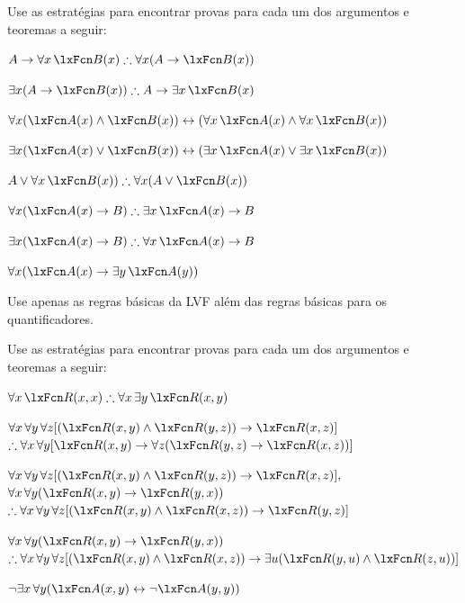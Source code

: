 \problempart
Use as estratégias para encontrar provas para cada um dos argumentos e teoremas a seguir:
\begin{compactlist}
\item $A \eif \forall x\,\atom{B}{x} \therefore \forall x(A \eif \atom{B}{x})$
\item $\exists x(A \eif \atom{B}{x}) \therefore A \eif \exists x\, \atom{B}{x}$
\item $\forall x(\atom{A}{x} \eand \atom{B}{x}) \eiff (\forall x\,\atom{A}{x} \eand \forall x\,\atom{B}{x})$
\item $\exists x(\atom{A}{x} \eor \atom{B}{x}) \eiff (\exists x\,\atom{A}{x} \eor \exists x\,\atom{B}{x})$
\item $A \eor \forall x\,\atom{B}{x}) \therefore \forall x(A \eor \atom{B}{x})$
\item $\forall x(\atom{A}{x} \eif B) \therefore \exists x\,\atom{A}{x} \eif B$
\item $\exists x(\atom{A}{x} \eif B) \therefore \forall x\,\atom{A}{x} \eif B$
\item $\forall x(\atom{A}{x} \eif \exists y\,\atom{A}{y})$
\end{compactlist}
Use apenas as regras básicas da LVF além das regras básicas para os quantificadores.

\problempart
Use as estratégias para encontrar provas para cada um dos argumentos e teoremas a seguir:
\begin{compactlist}
\item $\forall x\,\atom{R}{x,x} \therefore \forall x\,\exists y\,\atom{R}{x,y}$
\item $\forall x\,\forall y\,\forall z[(\atom{R}{x,y} \eand \atom{R}{y,z}) \eif \atom{R}{x,z}]$ \\
$\therefore \forall x\,\forall y[\atom{R}{x,y} \eif \forall z(\atom{R}{y,z} \eif \atom{R}{x,z})]$
\item $\forall x\,\forall y\,\forall z[(\atom{R}{x,y} \eand \atom{R}{y,z}) \eif \atom{R}{x,z}],$\\ $\forall x\,\forall y(\atom{R}{x,y} \eif \atom{R}{y, x})$ \\ $\therefore \forall x\,\forall y\,\forall z[(\atom{R}{x,y} \eand \atom{R}{x,z}) \eif \atom{R}{y,z}]$
\item $\forall x\,\forall y(\atom{R}{x,y} \eif \atom{R}{y, x})$ \\$\therefore \forall x\,\forall y\,\forall z[(\atom{R}{x,y} \eand \atom{R}{x,z}) \eif \exists u(\atom{R}{y,u} \eand \atom{R}{z,u})]$
\item $\enot \exists x\,\forall y (\atom{A}{x, y} \eiff \lnot\atom{A}{y, y})$
\end{compactlist}

